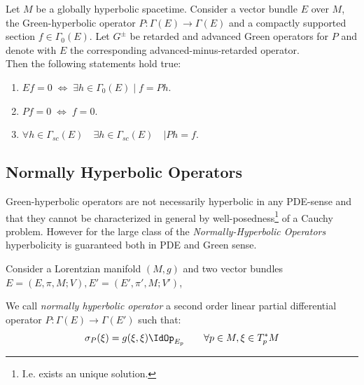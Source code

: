 \documentclass[Main]{subfiles}
\begin{document}
			
			\begin{corollary}\label{Corol:GreenKernel}
				Let $M$ be a globally hyperbolic spacetime. Consider a vector bundle $E$ over $M$, the Green-hyperbolic operator $P: \Gamma(E)\rightarrow \Gamma(E)$ and a compactly supported section $f\in \Gamma_{0}(E)$.
				Let $G^\pm$ be retarded and advanced Green operators for $P$ and denote with $E$ the corresponding advanced-minus-retarded operator.\\
				Then the following statements hold true:
					\begin{enumerate}
						\item $E f = 0 \; \Leftrightarrow \;  \exists h \in \Gamma_{0}(E) \; \vert \; f=P h $.
						\item $P f = 0 \; \Leftrightarrow \; f=0$.
						\item $\forall h \in \Gamma_{sc}(E)\quad \exists h \in \Gamma_{sc}(E)\quad \vert P h = f$.
					\end{enumerate}
			\end{corollary}
					
		\subsection{Normally Hyperbolic Operators}
			Green-hyperbolic operators are not necessarily hyperbolic in any PDE-sense and that they cannot be characterized in general by well-posedness\footnote{I.e. exists an unique solution.} of a Cauchy problem.
			However  for the large class of the \emph{Normally-Hyperbolic Operators} hyperbolicity is guaranteed both in PDE and Green sense.

		Consider a Lorentzian manifold $(M,g)$ and two vector bundles $E=(E,\pi,M;V), E'=(E',\pi',M;V')$,
		\begin{definition}\label{Def:NormalHyperOper}
			We call \emph{normally hyperbolic operator} a second order linear partial differential operator $P:\Gamma(E)\rightarrow \Gamma(E')$ such that:
			\begin{displaymath}
				\sigma_P(\xi) = g(\xi,\xi) \IdOp_{E_p} \qquad \forall p\in M, \xi \in T^*_pM
			\end{displaymath}
		\end{definition}
		
\end{document}
